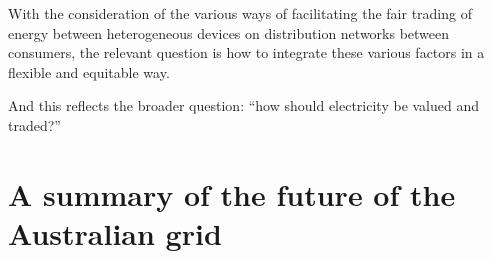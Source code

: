 With the consideration of the various ways of facilitating the fair trading of energy between heterogeneous devices on distribution networks between consumers, the relevant question is how to integrate these various factors in a flexible and equitable way.

\noindent And this reflects the broader question: ``how should electricity be valued and traded?''


\section{A summary of the future of the Australian grid}\label{sec:intro_summary}






